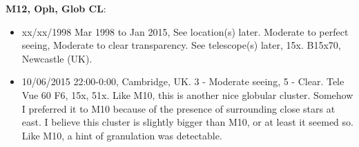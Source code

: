 {\bf M12, Oph, Glob CL}:
\begin{itemize}
\item xx/xx/1998 Mar 1998 to Jan 2015, See location(s) later. Moderate to perfect seeing, Moderate to clear transparency. See telescope(s) later, 15x. B15x70, Newcastle (UK).
\item 10/06/2015 22:00-0:00, Cambridge, UK. 3 - Moderate seeing, 5 - Clear. Tele Vue 60 F6, 15x, 51x. Like M10, this is another nice globular cluster. Somehow I preferred it to M10 because of the presence of surrounding close stars at east. I believe this cluster is slightly bigger than M10, or at least it seemed so. Like M10, a hint of granulation was detectable. 
\end{itemize}
